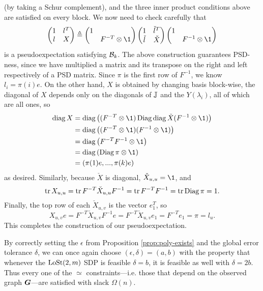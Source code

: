 \noindent (by taking a Schur complement), and the three inner product conditions above are satisfied on every block. We now need to check carefully that 
$$
    \begin{pmatrix} 1 & l^T \\ l & X \end{pmatrix}
    \triangleq \begin{pmatrix} 1 & \\ & F^{-T}\otimes \1 \end{pmatrix} \begin{pmatrix} 1 & \check l^T \\ \check l & \check X \end{pmatrix} \begin{pmatrix} 1 & \\ & F^{-1}\otimes \1 \end{pmatrix}
$$
is a pseudoexpectation satisfying $\mathcal{B}_k$. The above construction guarantees PSD-ness, since we have multiplied a matrix and its transpose on the right and left respectively of a PSD matrix. Since $\pi$ is the first row of $F^{-1}$, we know $l_i = \pi(i)e$. On the other hand, $X$ is obtained by changing basis block-wise, the diagonal of $X$ depends only on the diagonals of $\mathbb{J}$ and the $Y(\lambda_i)$, all of which are all ones, so
\begin{align*}
    \diag X 
    &= \diag\big((F^{-T}\otimes \1)\Diag\diag \check X (F^{-1}\otimes \1)\big) \\
    &=\diag\big((F^{-T}\otimes \1) (F^{-1}\otimes \1)\big) \\
    &= \diag\left(F^{-T}F^{-1} \otimes \1\right) \\
    &= \diag\left(\Diag\pi \otimes \1\right) \\
    &= (\pi(1)e,...,\pi(k)e)
\end{align*}
as desired. Similarly, because $\check X$ is diagonal, $\check X_{u,u} = \1$, and
$$
    \operatorname{tr} X_{u,u} = \operatorname{tr} F^{-T}\check X_{u,u} F^{-1} = \operatorname{tr} F^{-T}F^{-1} = \operatorname{tr} \operatorname{Diag} \pi = 1.
$$
Finally, the top row of each $\check X_{u,v}$ is the vector $e_1^T$, so
$$
    X_{u,v}e = F^{-T}\check X_{u,v}F^{-1}e = F^{-T}\check X_{u,v}e_1 = F^{-T}e_1 = \pi = l_u.
$$
This completes the construction of our pseudoexpectation.

\begin{remark}
    By correctly setting the $\epsilon$ from Proposition \ref{prop:poly-exists} and the global error tolerance $\delta$, we can once again choose $(\epsilon,\delta) = (a,b)$ with the property that whenever the $\operatorname{LoSt}(2,m)$ SDP is feasible $\delta = b$, it is feasible as well with $\delta = 2b$. Thus every one of the $\simeq$ constraints---i.e. those that depend on the observed graph $\boldsymbol{G}$---are satisfied with slack $\Omega(n)$.
\end{remark}

